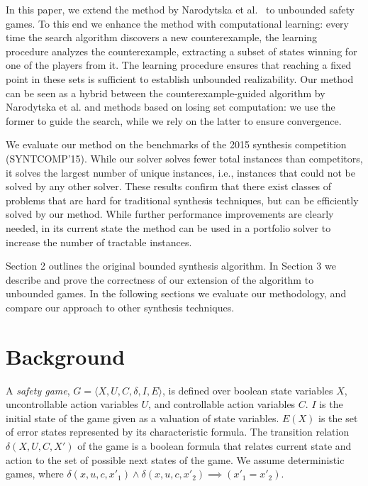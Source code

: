 \documentclass{llncs}
\begin{document}

In this paper, we extend the method by Narodytska et al.~\cite{narodytska2014} to unbounded 
safety games.  To this end we enhance the method with computational learning: every time
the search algorithm discovers a new counterexample, the learning procedure analyzes the 
counterexample, extracting a subset of states winning for one of the players from it.  
The learning procedure ensures that reaching a fixed point in these sets is sufficient to establish 
unbounded realizability.
Our method can be seen as a hybrid between the counterexample-guided algorithm
by Narodytska et al. and methods based on losing set computation: we use the
former to guide the search, while we rely on the latter to ensure convergence.

We evaluate our method on the benchmarks of the 2015 synthesis competition
(SYNTCOMP'15).  While our solver solves fewer total instances than competitors,
it solves the largest number of unique instances, i.e., instances that could not be solved by 
any other solver.  These results confirm that there exist classes of problems that are
hard for traditional synthesis techniques, but can be efficiently solved by our method.
While further performance improvements are clearly needed, in its current state the method 
can be used in a portfolio solver to increase the number of tractable instances.

Section 2 outlines the original bounded synthesis algorithm. In Section 3 we
describe and prove the correctness of our extension of the algorithm to
unbounded games. In the following sections we evaluate our methodology, and
compare our approach to other synthesis techniques.

\section{Background}

A \emph{safety game}, $G = \langle X, U, C, \delta, I, E \rangle$, is defined
over boolean state variables $X$, uncontrollable action variables $U$, and
controllable action variables $C$.  $I$ is the initial state of the game given
as a valuation of state variables.  $E(X)$ is the set of error states
represented by its characteristic formula.  The transition relation $\delta(X,
U, C, X')$ of the game is a boolean formula that relates current state and
action to the set of possible next states of the game.  We assume deterministic
games, where $\delta(x,u,c,x'_1) \land \delta(x,u,c,x'_2) \implies
(x'_1=x'_2)$.
\end{document}

